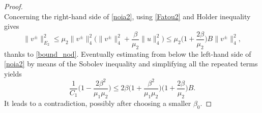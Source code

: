 \documentclass[reqno]{amsart}
\begin{document}
\begin{proof}
\begin{equation}
\end{equation}
Concerning the right-hand side of \eqref{noia2}, using \eqref{Fatou2} and Holder
inequality gives
\[
 \|v^{\pm}\|_{E_2}^2
 \le \mu_2 \|v^{\pm}\|_4^2 \Big(\|v^{\pm}\|_{4}^2
+ \frac{\beta}{\mu_2} \| u\|_4^2 \Big)
 \le \mu_2 \Big(1+ \frac{2\beta}{\mu_2} \Big) B
 \|v^{\pm}\|_4^2 ,
\]
thanks to \eqref{bound_nod}.
Eventually estimating from below the left-hand side of \eqref{noia2} by means of
the Sobolev inequality and simplifying all the repeated terms yields
\begin{equation}\label{noia3}
\frac{1}{C_1} \Big(1-\frac{2\beta^2}{\mu_1\mu_2} \Big)
\le 2{\beta}\Big(1+\frac{\beta^2}{\mu_1\mu_2}\Big)\Big(1+ \frac{2\beta}{\mu_2} \Big) B.
\end{equation}
It leads to a contradiction, possibly after choosing a smaller $\beta_0$.


\end{proof}
\end{document}
